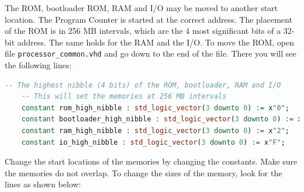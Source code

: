 \documentclass[12pt]{article}
\begin{document}
The ROM, bootloader ROM, RAM and I/O may be moved to another start location. The Program Counter is started at the correct address. The placement of the ROM is in 256 MB intervals, which are the 4 most significant bits of a 32-bit address. The same holds for the RAM and the I/O. To move the ROM, open file \lstinline|processor_common.vhd| and go down to the end of the file. There you will see the following lines:

\begin{lstlisting}[language=VHDL]
    -- The highest nibble (4 bits) of the ROM, bootloader, RAM and I/O
    -- This will set the memories at 256 MB intervals
    constant rom_high_nibble : std_logic_vector(3 downto 0) := x"0";
    constant bootloader_high_nibble : std_logic_vector(3 downto 0) := x"1";
    constant ram_high_nibble : std_logic_vector(3 downto 0) := x"2";
    constant io_high_nibble : std_logic_vector(3 downto 0) := x"F";
\end{lstlisting}

Change the start locations of the memories by changing the constants. Make sure the memories do not overlap. To change the sizes of the memory, look for the lines as shown below:
\end{document}
